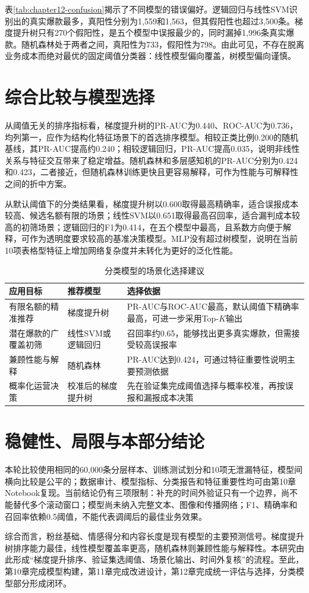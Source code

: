 表\ref{tab:chapter12-confusion}揭示了不同模型的错误偏好。逻辑回归与线性SVM识别出的真实爆款最多，真阳性分别为1,559和1,563，但其假阳性也超过3,500条。梯度提升树只有270个假阳性，是五个模型中误报最少的，同时漏掉1,996条真实爆款。随机森林处于两者之间，真阳性为733，假阳性为798。由此可见，不存在脱离业务成本而绝对最优的固定阈值分类器：线性模型偏向覆盖，树模型偏向谨慎。

\enlargethispage{3\baselineskip}
\section{综合比较与模型选择}
从阈值无关的排序指标看，梯度提升树的PR-AUC为0.440、ROC-AUC为0.736，均列第一，应作为结构化特征场景下的首选排序模型。相较正类比例0.200的随机基线，其PR-AUC提高约0.240；相较逻辑回归，PR-AUC提高0.035，说明非线性关系与特征交互带来了稳定增益。随机森林和多层感知机的PR-AUC分别为0.424和0.423，二者接近，但随机森林训练更快且更容易解释，可作为性能与可解释性之间的折中方案。

从默认阈值下的分类结果看，梯度提升树以0.600取得最高精确率，适合误报成本较高、候选名额有限的场景；线性SVM以0.651取得最高召回率，适合漏判成本较高的初筛场景；逻辑回归的F1为0.414，在五个模型中最高，且系数方向便于解释，可作为透明度要求较高的基准决策模型。MLP没有超过树模型，说明在当前10项表格型特征上增加网络复杂度并未转化为更好的泛化性能。

\begin{table}[htbp]
\centering
\caption{分类模型的场景化选择建议}
\label{tab:chapter12-selection}
\begin{tabular}{p{3.2cm}p{3.2cm}p{7.0cm}}
\toprule
应用目标 & 推荐模型 & 选择依据 \\
\midrule
有限名额的精准推荐 & 梯度提升树 & PR-AUC与ROC-AUC最高，默认阈值下精确率最高，可进一步采用Top-$K$输出 \\
潜在爆款的广覆盖初筛 & 线性SVM或逻辑回归 & 召回率约0.65，能够找出更多真实爆款，但需接受较高误报率 \\
兼顾性能与解释 & 随机森林 & PR-AUC达到0.424，可通过特征重要性说明主要预测依据 \\
概率化运营决策 & 校准后的梯度提升树 & 先在验证集完成阈值选择与概率校准，再按误报和漏报成本决策 \\
\bottomrule
\end{tabular}
\end{table}

\section{稳健性、局限与本部分结论}
本轮比较使用相同的60,000条分层样本、训练测试划分和10项无泄漏特征，模型间横向比较是公平的；数据审计、模型指标、分类报告和特征重要性均可由第10章Notebook复现。当前结论仍有三项限制：补充的时间外验证只有一个边界，尚不能替代多个滚动窗口；模型尚未纳入完整文本、图像和传播网络；F1、精确率和召回率依赖0.5阈值，不能代表调阈后的最佳业务效果。

综合而言，粉丝基础、情感得分和内容长度是现有模型的主要预测信号。梯度提升树排序能力最佳，线性模型覆盖率更高，随机森林则兼顾性能与解释性。本研究由此形成“梯度提升排序、验证集选阈值、场景化输出、时间外复核”的流程。至此，第10章完成模型构建，第11章完成改进设计，第12章完成统一评估与选择，分类模型部分形成闭环。
